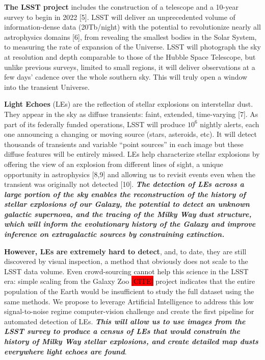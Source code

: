 \documentclass{proposalnsf}
\newcommand{\ana}[1]{\colorbox{red}{#1}}
\begin{document}
{\bf The LSST project} includes the construction of a telescope and a 10-year survey to begin in 2022 [5].  LSST will deliver an unprecedented volume of information-dense data (20Tb/night) with the potential to revolutionize nearly all astrophysics domains [6], from revealing the smallest bodies in the Solar System, to measuring the rate of expansion of the Universe.   LSST will photograph the sky at resolution and depth comparable to those of the Hubble Space Telescope, but unlike previous surveys, limited to small regions, it will deliver observations at a few days’ cadence over the whole southern sky.   This will truly open a window into the transient Universe.  

{\bf Light Echoes} (LEs) are the reflection of stellar explosions on interstellar dust.  They appear in the sky as diffuse transients: faint, extended, time-varying [7].  
As part of its federally funded operations, LSST will produce $10^6$ nightly alerts, each one announcing a changing or moving source (stars, asteroids, etc).   It will detect thousands of transients and variable “point sources” in each image but these diffuse features will be entirely missed.   LEs help characterize stellar explosions by offering the view of an explosion from different lines of sight, a unique opportunity in astrophysics [8,9] 
 and allowing us to revisit events even when the transient was originally not detected [10].  
{\bf\emph{ The detection of LEs across a large portion of the sky enables the reconstruction of the history of stellar explosions of our Galaxy, the potential to detect an unknown galactic supernova, and the tracing of the Milky Way dust structure, which will inform the evolutionary history of the Galaxy and improve inference on extragalactic sources by constraining extinction.  }}


{\bf However, LEs are extremely hard to detect}, and, to date, they are still discovered by visual inspection, a method that obviously does not scale to the LSST data volume.   Even crowd-sourcing cannot help this science in the LSST era: simple scaling from the Galaxy Zoo \ana{[CITE]} project indicates that the entire population of the Earth would be insufficient to study the full dataset using the same methods.   We propose to leverage Artificial Intelligence to address this low signal-to-noise regime computer-vision challenge and create the first pipeline for automated detection of LEs.   {\bf \emph{This will allow us to use images from the LSST survey to produce a census of LEs that would constrain the history of Milky Way stellar explosions, and create detailed map dusts everywhere light echoes are found}}.
\end{document}
